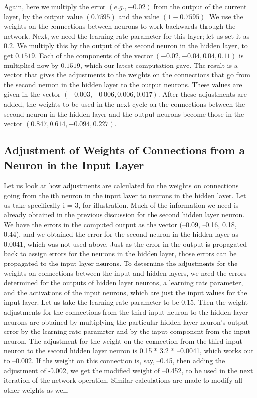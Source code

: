 \documentclass[12pt, right open]{memoir}
\begin{document}
Again, here we multiply the error $(e.g., -0.02)$ from the output of the current layer, by the output value $(0.7595)$ and the value $(1-0.7595)$. We use the weights on the connections between neurons to work backwards through the network. Next, we need the learning rate parameter for this layer; let us set it as $0.2$. We multiply this by the output of the second neuron in the hidden layer, to get $0.1519$. Each of the components of the vector $(-0.02, -0.04, 0.04, 0.11)$ is multiplied now by $0.1519$, which our latest computation gave. The result is a vector that gives the adjustments to the weights on the connections that go from the second neuron in the hidden layer to the output neurons. These values are given in the vector $(-0.003, -0.006, 0.006,0.017)$. After these adjustments are added, the weights to be used in the next cycle on the connections between the second neuron in the hidden layer and the output neurons become those in the vector
$(0.847, 0.614, -0.094, 0.227)$.

\subsection{Adjustment of Weights of Connections from a Neuron in
the Input Layer}

Let us look at how adjustments are calculated for the weights on connections going from the ith neuron in the input layer to neurons in the hidden layer. Let us take specifically i = 3, for illustration. Much of the information we need is already obtained in the previous discussion for the second hidden layer neuron. We have the errors in the computed output as the vector (–0.09, –0.16, 0.18, 0.44), and we obtained the error for the second neuron in the hidden layer as –0.0041, which was not used above. Just as the error in the output is propagated back to assign errors for the neurons in the hidden layer, those errors can be propagated to the input layer neurons.
To determine the adjustments for the weights on connections between the input and hidden layers, we need the errors determined for the outputs of hidden layer neurons, a learning rate parameter, and the activations of the input neurons, which are just the input values for the input layer. Let us take the learning rate parameter to be 0.15. Then the weight adjustments for the connections from the third input neuron to the hidden layer neurons are obtained by multiplying the particular hidden layer neuron’s output error by the learning rate parameter and by the input component from the input neuron. The adjustment for the weight on the connection from the third input neuron to the second hidden layer neuron is 0.15 * 3.2 * –0.0041, which works out to –0.002. If the weight on this connection is, say, –0.45, then adding the adjustment of -0.002, we get the modified
weight of –0.452, to be used in the next iteration of the network operation. Similar calculations are made to modify all other weights as well.
\end{document}
